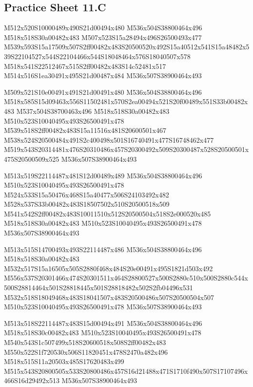 \documentclass{article}
\begin{document}
\subsection{Practice Sheet 11.C}

\begin{multicols}{5}
\begin{center}

M512x520S10000489x490S21d00494x480 %
M536x504S38800464x496 %
M518x518S30a00482x483 %
M507x523S15a28494x496S26500493x477 %
M539x593S15a17509x507S2ff00482x483S20500520x492S15a40512x541S15a48482x539S22104527x544S22104466x544S18048464x576S18040507x578 %
M518x541S22512467x515S2ff00482x483S14c52481x517 %
M514x516S1ea30491x495S21d00487x484 %
M536x507S38900464x493 %
\vfil
\columnbreak

M509x521S10e00491x491S21d00491x480 %
M536x504S38800464x496 %
M518x585S15d09463x556S11502481x570S2ea00494x521S20f00489x551S33b00482x483 %
M537x504S38700463x496 %
M518x518S30a00482x483 %
M510x523S10040495x493S26500491x478 %
M539x518S2ff00482x483S15a11516x481S20600501x467 %
M538x524S20500484x491S2c400498x501S16740491x477S16748462x477 %
M519x543S20314481x476S20310486x457S20300492x509S20300487x528S20500501x475S20500509x525 %
M536x507S38900464x493 %
\vfil
\columnbreak

M513x519S22114487x481S12d00489x489 %
M536x504S38800464x496 %
M510x523S10040495x493S26500491x478 %
M524x533S15a50476x468S15a40477x506S24103492x482 %
M528x537S33b00482x483S18507502x510S20500518x509 %
M541x542S2ff00482x483S10011510x512S20500504x518S2e000520x485 %
M518x518S30a00482x483 %
M510x523S10040495x493S26500491x478 %
M536x507S38900464x493 %
\vfil
\columnbreak

M513x515S14700493x493S22114487x486 %
M536x504S38800464x496 %
M518x518S30a00482x483 %
M532x517S15a16505x505S2880f468x484S20e00491x495S1821d503x492 %
M556x537S20301466x474S20301511x464S28800527x500S2880c510x500S2880c544x500S28814464x501S28818445x501S28818482x502S2fb04496x531 %
M532x518S18049468x483S18041507x483S20500486x507S20500504x507 %
M510x523S10040495x493S26500491x478 %
M536x507S38900464x493 %
\vfil
\columnbreak

M513x518S22114487x483S15d00494x491 %
M536x504S38800464x496 %
M518x518S30c00482x483 %
M510x523S10040495x493S26500491x478 %
M540x543S1c507499x518S20600518x508S2ff00482x483 %
M550x522S1f720530x506S11820451x478S2470a482x496 %
M518x515S11a20503x485S17620483x499 %
M515x543S20800505x533S20800486x457S16d21488x471S1710f490x507S17107496x466S16d29492x513 %
M536x507S38900464x493 %
\vfil

\end{center}
\end{multicols}
\end{document}
